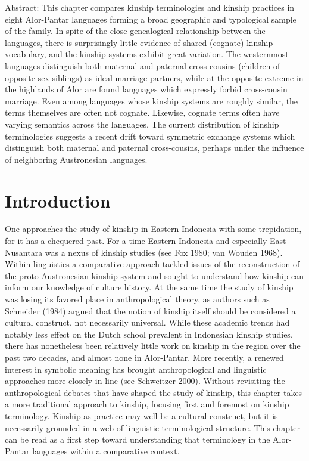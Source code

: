 Abstract: This chapter compares kinship terminologies and kinship practices in eight Alor-Pantar languages forming a broad geographic and typological sample of the family. In spite of the close genealogical relationship between the languages, there is surprisingly little evidence of shared (cognate) kinship vocabulary, and the kinship systems exhibit great variation. The westernmost languages distinguish both maternal and paternal cross-cousins (children of opposite-sex siblings) as ideal marriage partners, while at the opposite extreme in the highlands of Alor are found languages which expressly forbid cross-cousin marriage. Even among languages whose kinship systems are roughly similar, the terms themselves are often not cognate. Likewise, cognate terms often have varying semantics across the languages. The current distribution of kinship terminologies suggests a recent drift toward symmetric exchange systems which distinguish both maternal and paternal cross-cousins, perhaps under the influence of 
neighboring Austronesian languages. 

\section[Introduction]{Introduction\footnotemark{}}
\hypertarget{RefHeading78013871885726}{}\hypertarget{Toc376958238}{}
One approaches the study of kinship in Eastern Indonesia with some trepidation, for it has a chequered past. For a time Eastern Indonesia and especially East Nusantara was a nexus of kinship studies (see Fox 1980; van Wouden 1968). Within linguistics a comparative approach tackled issues of the reconstruction of the proto-Austronesian kinship system and sought to understand how kinship can inform our knowledge of culture history. At the same time the study of kinship was losing its favored place in anthropological theory, as authors such as Schneider (1984) argued that the notion of kinship itself should be considered a cultural construct, not necessarily universal. While these academic trends had notably less effect on the Dutch school prevalent in Indonesian kinship studies, there has nonetheless been relatively little work on kinship in the region over the past two decades, and almost none in Alor-Pantar. More recently, a renewed interest in symbolic meaning has brought anthropological and linguistic 
approaches more closely in line (see Schweitzer 2000). Without revisiting the anthropological debates that have shaped the study of kinship, this chapter takes a more traditional approach to kinship, focusing first and foremost on kinship terminology. Kinship as practice may well be a cultural construct, but it is necessarily grounded in a web of linguistic terminological structure. This chapter can be read as a first step toward understanding that terminology in the Alor-Pantar languages within a comparative context.

